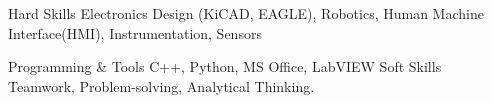 \newpage
{}


\begin{cvskills}
  \cvskill
    {Hard Skills} %
    {Electronics Design (KiCAD, EAGLE), Robotics, Human Machine Interface(HMI), Instrumentation, Sensors} %

  \cvskill
    {Programming \& Tools} %
    {C++, Python, MS Office, LabVIEW} %
  \cvskill
    {Soft Skills} %
    {Teamwork, Problem-solving, Analytical Thinking.} %

\end{cvskills}
